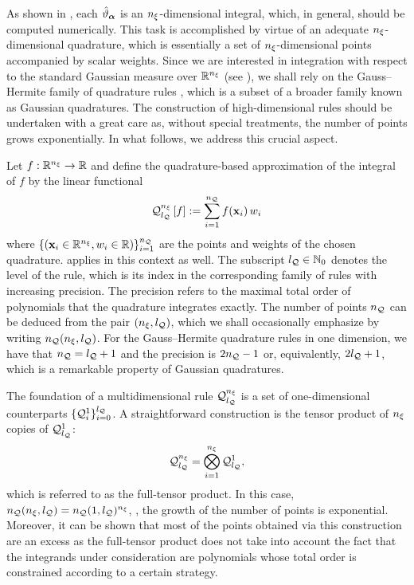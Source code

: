As shown in , each $\hat{\vartheta}_{\bm{\alpha}}$ is an ${n_\xi}$-dimensional integral, which, in general, should be computed numerically.
This task is accomplished by virtue of an adequate ${n_\xi}$-dimensional quadrature, which is essentially a set of ${n_\xi}$-dimensional points accompanied by scalar weights.
Since we are interested in integration with respect to the standard Gaussian measure over $\mathbb{R}^{n_\xi}$ (see ), we shall rely on the Gauss--Hermite family of quadrature rules \cite{maitre2010}, which is a subset of a broader family known as Gaussian quadratures.
The construction of high-dimensional rules should be undertaken with a great care as, without special treatments, the number of points grows exponentially.
In what follows, we address this crucial aspect.

Let $f: \mathbb{R}^{n_\xi} \to \mathbb{R}$ and define the quadrature-based approximation of the integral of $f$ by the linear functional
\[
  \quadrature{\nvars}{\nqlevel}{f} := \sum_{i = 1}^\nqorder f(\point_i) \, \weight_i
\]
where $\{ (\mathbf{x}_i \in \mathbb{R}^{n_\xi}, w_i \in \mathbb{R}) \}_{i = 1}^{n_\mathcal{Q}}$ are the points and weights of the chosen quadrature.
 applies in this context as well.
The subscript ${l_\mathcal{Q}} \in \mathbb{N}_{0}$ denotes the level of the rule, which is its index in the corresponding family of rules with increasing precision.
The precision refers to the maximal total order of polynomials that the quadrature integrates exactly.
The number of points ${n_\mathcal{Q}}$ can be deduced from the pair $({n_\xi}, {l_\mathcal{Q}})$, which we shall occasionally emphasize by writing ${n_\mathcal{Q}}({n_\xi}, {l_\mathcal{Q}})$.
For the Gauss--Hermite quadrature rules in one dimension, we have that ${n_\mathcal{Q}} = {l_\mathcal{Q}} + 1$ and the precision is $2 {n_\mathcal{Q}} - 1$ \cite{heiss2008} or, equivalently, $2 {l_\mathcal{Q}} + 1$, which is a remarkable property of Gaussian quadratures.

The foundation of a multidimensional rule $\quadrature$ is a set of one-dimensional counterparts $\{ \quadrature{1}{i} \}_{i = 0}^\nqlevel$.
A straightforward construction is the tensor product of ${n_\xi}$ copies of $\quadrature{1}{\nqlevel}$:
\begin{equation} \xelab{full-tensor-product-grid}
  \quadrature = \bigotimes_{i = 1}^\nvars \quadrature{1}{\nqlevel},
\end{equation}
which is referred to as the full-tensor product.
In this case, ${n_\mathcal{Q}}({n_\xi}, {l_\mathcal{Q}}) = {n_\mathcal{Q}}(1, {l_\mathcal{Q}})^{n_\xi}$, \ie, the growth of the number of points is exponential.
Moreover, it can be shown that most of the points obtained via this construction are an excess as the full-tensor product does not take into account the fact that the integrands under consideration are polynomials whose total order is constrained according to a certain strategy.

